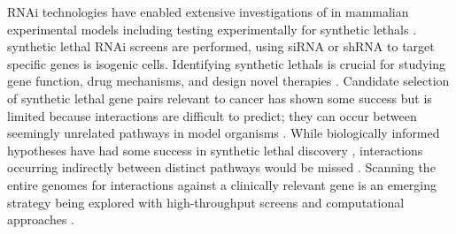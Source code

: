 \acrfull{RNAi} technologies have enabled extensive investigations of  in mammalian experimental models including testing experimentally for \glspl{synthetic lethal} \citep{Fraser2004}. \Gls{synthetic lethal} \gls{RNAi} screens are performed, using \acrfull{siRNA} or \gls{shRNA} to target specific genes is isogenic cells. Identifying \glspl{synthetic lethal} is crucial for studying gene function, drug mechanisms, and design novel therapies \citep{Lum2004}. Candidate selection of \gls{synthetic lethal} gene pairs relevant to cancer has shown some success but is limited because interactions are difficult to predict; they can occur between seemingly unrelated \glspl{pathway} in model organisms \citep{Costanzo2011}. While biologically informed hypotheses have had some success in \gls{synthetic lethal} discovery \citep{Bitler2015, Bryant2005, Farmer2005}, interactions occurring indirectly between distinct \glspl{pathway} would be missed \citep{Boone2007, Costanzo2011}. Scanning the entire \glspl{genome} for interactions against a clinically relevant gene is an emerging strategy being explored with \glspl{high-throughput screen} \citep{Fece2015} and computational approaches \citep{Boucher2013, vanSteen2011}.    

